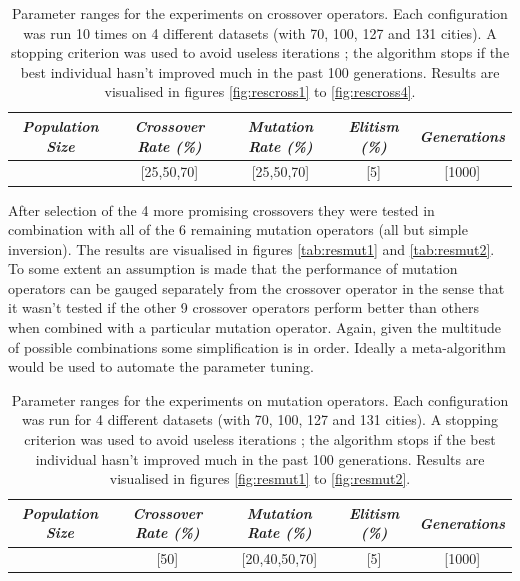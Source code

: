 \begin{table}[h]
\centering
\begin{tabular}{c|c|c|c|c}
\textit{Population Size} & \textit{Crossover Rate (\%)} & \textit{Mutation Rate (\%)} & \textit{Elitism (\%)} & \textit{Generations} \\\hline 
[300] & [25,50,70] & [25,50,70] & [5] & [1000]
\end{tabular}
\caption{Parameter ranges for the experiments on crossover operators. Each configuration was run 10 times on 4 different datasets (with 70, 100, 127 and 131 cities). A stopping criterion was used to avoid useless iterations ; the algorithm stops if the best individual hasn't improved much in the past 100 generations. Results are visualised in figures \ref{fig:rescross1} to \ref{fig:rescross4}.}
\label{tab:par2}
\end{table}

\par\noindent After selection of the 4 more promising crossovers they were tested in combination with all of the 6 remaining mutation operators (all but simple inversion). The results are visualised in figures \ref{tab:resmut1} and \ref{tab:resmut2}. To some extent an assumption is made that the performance of mutation operators can be gauged separately from the crossover operator in the sense that it wasn't tested if the other 9 crossover operators perform better than others when combined with a particular mutation operator. Again, given the multitude of possible combinations some simplification is in order. Ideally a meta-algorithm would be used to automate the parameter tuning.

\begin{table}[h]
\centering
\begin{tabular}{c|c|c|c|c}
\textit{Population Size} & \textit{Crossover Rate (\%)} & \textit{Mutation Rate (\%)} & \textit{Elitism (\%)} & \textit{Generations} \\\hline 
[300] & [50] & [20,40,50,70] & [5] & [1000]
\end{tabular}
\caption{Parameter ranges for the experiments on mutation operators. Each configuration was run for 4 different datasets (with 70, 100, 127 and 131 cities). A stopping criterion was used to avoid useless iterations ; the algorithm stops if the best individual hasn't improved much in the past 100 generations. Results are visualised in figures \ref{fig:resmut1} to \ref{fig:resmut2}.}
\label{tab:par3}
\end{table}

